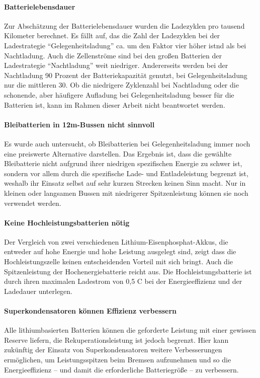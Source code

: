 \paragraph{Batterielebensdauer} Zur Abschätzung der Batterielebensdauer wurden die Ladezyklen pro tausend Kilometer berechnet. Es fällt auf, das die Zahl der Ladezyklen bei der Ladestrategie "`Gelegenheitsladung"' ca. um den Faktor vier höher istnd als bei Nachtladung. Auch die Zellenströme sind bei den großen Batterien der Ladestrategie "`Nachtladung"' weit niedriger. Andererseits werden bei der Nachtladung 90 Prozent der Batteriekapazität genutzt, bei Gelegenheitsladung nur die mittleren 30. Ob die niedrigere Zyklenzahl bei Nachtladung oder die schonende, aber häufigere Aufladung bei Gelegenheitsladung besser für die Batterien ist, kann im Rahmen dieser Arbeit nicht beantwortet werden.

\paragraph{Bleibatterien in 12m-Bussen nicht sinnvoll} Es wurde auch untersucht, ob Bleibatterien bei Gelegenheitsladung immer noch eine preiswerte Alternative darstellen. Das Ergebnis ist, dass die gewählte Bleibatterie nicht aufgrund ihrer niedrigen spezifischen Energie zu schwer ist, sondern vor allem durch die spezifische Lade- und Entladeleistung begrenzt ist, weshalb ihr Einsatz selbst auf sehr kurzen Strecken keinen Sinn macht. Nur in kleinen oder langsamen Bussen mit niedrigerer Spitzenleistung können sie noch verwendet werden.

\paragraph{Keine Hochleistungsbatterien nötig} Der Vergleich von zwei verschiedenen Lithium-Eisenphosphat-Akkus, die entweder auf hohe Energie und hohe Leistung ausgelegt sind, zeigt dass die Hochleistungszelle keinen entscheidenden Vorteil mit sich bringt. Auch die Spitzenleistung der Hochenergiebatterie reicht aus. Die Hochleistungsbatterie ist durch ihren maximalen Ladestrom von 0,5 C bei  der Energieeffizienz und der Ladedauer unterlegen.

\paragraph{Superkondensatoren können Effizienz verbessern} Alle lithiumbasierten Batterien können die geforderte Leistung mit einer gewissen Reserve liefern, die Rekuperationsleistung ist jedoch begrenzt. Hier kann zukünftig der Einsatz von Superkondensatoren weitere Verbesserungen ermöglichen, um Leistungsspitzen beim Bremsen aufzunehmen und so die Energieeffizienz – und damit die erforderliche Batteriegröße – zu verbessern.

